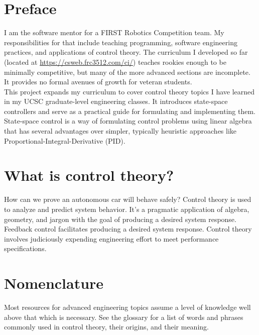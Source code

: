 \documentclass[10pt,conference,compsoc]{IEEEtran}
\begin{document}
\tableofcontents
\listoffigures
\listoftables
\clearpage


\section{Preface}

\noindent I am the software mentor for a FIRST Robotics Competition team. My
responsibilities for that include teaching programming, software engineering
practices, and applications of control theory. The curriculum I developed so far
(located at \url{https://csweb.frc3512.com/ci/}) teaches rookies enough to be
minimally competitive, but many of the more advanced sections are incomplete. It
provides no formal avenues of growth for veteran students. \\

\noindent This project expands my curriculum to cover control theory topics I
have learned in my UCSC graduate-level engineering classes. It introduces
state-space controllers and serve as a practical guide for formulating and
implementing them. State-space control is a way of formulating control problems
using linear algebra that has several advantages over simpler, typically
heuristic approaches like Proportional-Integral-Derivative (PID).

\section{What is control theory?}

\noindent How can we prove an autonomous car will behave safely? Control theory
is used to analyze and predict \gls{system} behavior. It's a pragmatic
application of algebra, geometry, and jargon with the goal of producing a
desired system response. Feedback control facilitates producing a desired
system response. Control theory involves judiciously expending engineering
effort to meet performance specifications.

\section{Nomenclature}

\noindent Most resources for advanced engineering topics assume a level of
knowledge well above that which is necessary. See the glossary for a list of
words and phrases commonly used in control theory, their origins, and their
meaning. \\
\end{document}
